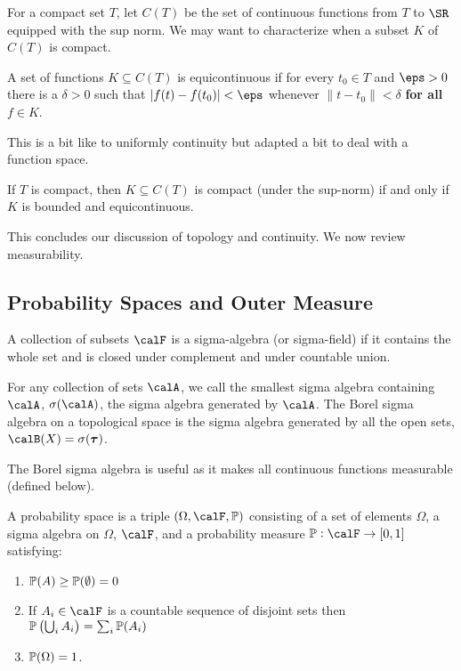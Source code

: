 For a compact set \(T\), let  \(C(T)\) be the set of continuous functions from  \(T\) to  \(\SR\) equipped with the sup norm. We may want to characterize when a subset \(K\) of  \(C(T)\) is compact. 

\begin{definition}[Equicontinuous]
	\label{def:equicontinuous}
	A set of functions \(K \subseteq C(T)\) is equicontinuous if for every  \(t_0 \in T\) and  \(\eps > 0\) there is a  \(\delta > 0\) such that  \(|f(t)-f(t_0)|<\eps\) whenever  \(\|t-t_0\|<\delta\) \textbf{for all} \(f\in K\).
\end{definition}
This is a bit like to uniformly continuity but adapted a bit to deal with a function space. 
\begin{theorem}
	\label{thm:aa}
	If  \(T\) is compact, then  \(K \subseteq C(T)\) is compact (under the sup-norm) if and only if  \(K\) is bounded and equicontinuous.
\end{theorem}

This concludes our discussion of topology and continuity. We now review measurability.

\subsection{Probability Spaces and Outer Measure}%
\label{sec:probability}
\begin{definition}
	\label{def:sigma-algebra}
	A collection of subsets \(\calF\) is a sigma-algebra (or sigma-field) if it contains the whole set and is closed under complement and under countable union.
\end{definition}

\begin{definition}
	\label{def:borel}
	For any collection of sets \(\calA\), we call the smallest sigma algebra containing \(\calA\), \(\sigma(\calA)\), the sigma algebra generated by \(\calA\). The Borel sigma algebra  on a topological space is the sigma algebra generated by all the open sets, \(\calB(X) = \sigma(\boldsymbol{\tau})\).
\end{definition}

The Borel sigma algebra is useful as it makes all continuous functions measurable (defined below). 

\begin{definition}
	\label{def:prob-space}
	A probability space is a triple \((\Omega, \calF, \P)\) consisting of a set of elements \(\Omega\), a sigma algebra on  \(\Omega\),  \(\calF\), and a probability measure  \(\P:\calF \to [0,1]\) satisfying:
	 \begin{enumerate}
		 \item \(\P(A) \geq \P(\emptyset) = 0\) 
		 \item If \(A_i \in \calF\) is a countable sequence of disjoint sets then  \(\P\left(\bigcup_i A_i\right) = \sum_{i} \P(A_i)\) 
		 \item \(\P(\Omega) = 1\).
	\end{enumerate}
\end{definition}

